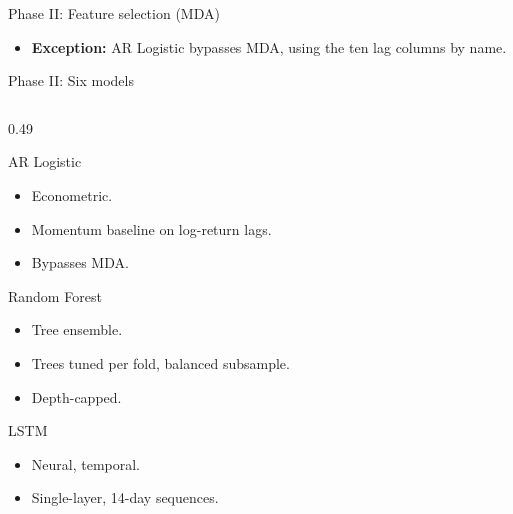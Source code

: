 \documentclass[aspectratio=169, t]{beamer}
\begin{document}
\begin{frame}{Phase II: Feature selection (MDA)}
\vspace{0.5em}

\begin{itemize}\footnotesize
  \item \textbf{Exception:} AR Logistic bypasses MDA, using the ten lag columns by name.
\end{itemize}

\end{frame}


\begin{frame}{Phase II: Six models}
\vspace{-2.0em}
\begin{columns}[T]
\begin{column}{0.49\textwidth}
{
\begin{block}{AR Logistic}
\scriptsize
\begin{itemize}\setlength{\itemsep}{0pt}
  \item Econometric.
  \item Momentum baseline on log-return lags.
  \item Bypasses MDA.
\end{itemize}
\end{block}
}
\vspace{-0.5em}
{
\begin{block}{Random Forest}
\scriptsize
\begin{itemize}\setlength{\itemsep}{0pt}
  \item Tree ensemble.
  \item Trees tuned per fold, balanced subsample.
  \item Depth-capped.
\end{itemize}
\end{block}
}
\vspace{-0.5em}
{
\begin{block}{LSTM}
\scriptsize
\begin{itemize}\setlength{\itemsep}{0pt}
  \item Neural, temporal.
  \item Single-layer, 14-day sequences.

\end{itemize}
\end{block}}
\end{column}
\end{columns}
\end{frame}
\end{document}
